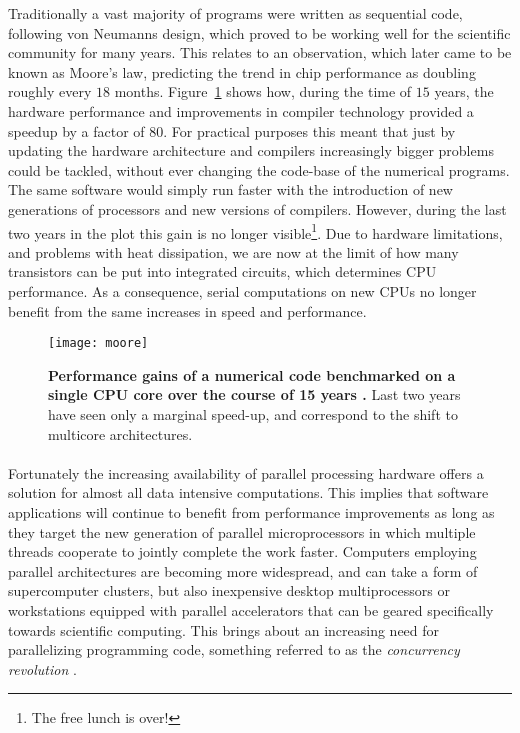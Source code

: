 Traditionally a vast majority of programs were written as sequential code, following von Neumanns design, which proved to be working well for the scientific community for many years.
This relates to an observation, which later came to be known as Moore's law, predicting the trend in chip performance as doubling roughly every $18$ months.
Figure~\ref{fig:moore} shows how, during the time of $15$ years, the hardware performance and improvements in compiler technology provided a speedup by a factor of $80$.
For practical purposes this meant that just by updating the hardware architecture and compilers increasingly bigger problems could be tackled, without ever changing the code-base of the numerical programs. 
The same software would simply run faster with the introduction of new generations of processors and new versions of compilers.
However, during the last two years in the plot this gain is no longer visible\footnote{The free lunch is over!}.
Due to hardware limitations, and problems with heat dissipation, we are now at the limit of how many transistors can be put into integrated circuits, which determines CPU performance.
As a consequence, serial computations on new CPUs no longer benefit from the same increases in speed and performance.

\begin{figure}[H]
\centering
\texttt{[image: moore]}
\caption{
{ \footnotesize 
{\bf Performance gains of a numerical code benchmarked on a single CPU core over the course of 15 years \citep{Turek1999}.}
Last two years have seen only a marginal speed-up, and correspond to the shift to multicore architectures.
} %
}
\label{fig:moore}
\end{figure}


\paragraph{}
Fortunately the increasing availability of parallel processing hardware offers a solution for almost all data intensive computations.
This implies that software applications will continue to benefit from performance improvements as long as they target the new generation of parallel microprocessors in which multiple threads cooperate to jointly complete the work faster.
Computers employing parallel architectures are becoming more widespread, and can take a form of supercomputer clusters, but also inexpensive desktop multiprocessors or workstations equipped with parallel accelerators that can be geared specifically towards scientific computing.
This brings about an increasing need for parallelizing programming code, something referred to as the \textit{concurrency revolution} \citep{Sutter2005}.

